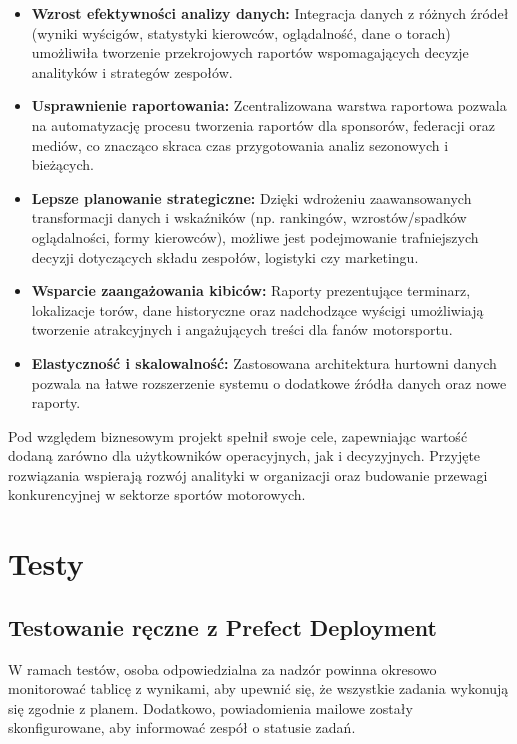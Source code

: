 \documentclass[12pt]{article}
\begin{document}
\begin{itemize}
    \item \textbf{Wzrost efektywności analizy danych:} Integracja danych z różnych źródeł (wyniki wyścigów, statystyki kierowców, oglądalność, dane o torach) umożliwiła tworzenie przekrojowych raportów wspomagających decyzje analityków i strategów zespołów.

    \item \textbf{Usprawnienie raportowania:} Zcentralizowana warstwa raportowa pozwala na automatyzację procesu tworzenia raportów dla sponsorów, federacji oraz mediów, co znacząco skraca czas przygotowania analiz sezonowych i bieżących.

    \item \textbf{Lepsze planowanie strategiczne:} Dzięki wdrożeniu zaawansowanych transformacji danych i wskaźników (np. rankingów, wzrostów/spadków oglądalności, formy kierowców), możliwe jest podejmowanie trafniejszych decyzji dotyczących składu zespołów, logistyki czy marketingu.

    \item \textbf{Wsparcie zaangażowania kibiców:} Raporty prezentujące terminarz, lokalizacje torów, dane historyczne oraz nadchodzące wyścigi umożliwiają tworzenie atrakcyjnych i angażujących treści dla fanów motorsportu.

    \item \textbf{Elastyczność i skalowalność:} Zastosowana architektura hurtowni danych pozwala na łatwe rozszerzenie systemu o dodatkowe źródła danych oraz nowe raporty.
\end{itemize}

Pod względem biznesowym projekt spełnił swoje cele, zapewniając wartość dodaną zarówno dla użytkowników operacyjnych, jak i decyzyjnych. Przyjęte rozwiązania wspierają rozwój analityki w organizacji oraz budowanie przewagi konkurencyjnej w sektorze sportów motorowych.


\section{Testy}
\subsection{Testowanie ręczne z Prefect Deployment}
W ramach testów, osoba odpowiedzialna za nadzór powinna okresowo monitorować tablicę z wynikami, aby upewnić się, że wszystkie zadania wykonują się zgodnie z planem. Dodatkowo, powiadomienia mailowe zostały skonfigurowane, aby informować zespół o statusie zadań.
\end{document}
